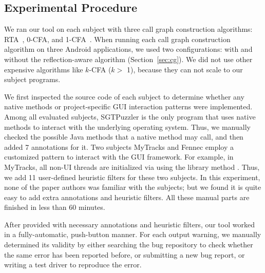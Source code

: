 \subsection{Experimental Procedure}
\label{sec:procedural}

We ran our tool on each subject with three call graph construction
algorithms: RTA~\cite{rta}, 0-CFA, and 1-CFA~\cite{kcfa}.  When running
each call graph construction algorithm on three Android applications, we
used two configurations: with and without the reflection-aware algorithm 
(Section~\ref{sec:cg}).  We did not use other expensive algorithms like $k$-CFA ($k >$ 1),
because they can not scale to our subject programs.

We first inspected the source code of each subject to determine whether any
native methods or project-specific GUI interaction patterns were implemented.
Among all evaluated subjects, SGTPuzzler is the only program that
uses native methods to interact with
the underlying operating system. Thus, we manually checked the possible
Java methods that a native method may call, and then added 7 
annotations for it. Two subjects MyTracks and Fennec employ a customized pattern
to interact with the GUI framework. For example, in MyTracks, all non-UI
threads are initialized via using the library method .
Thus, we add 11 user-defined heuristic filters for these two subjects.
In this experiment, none of the paper
authors was familiar with the subjects; but we found it is quite easy
to add extra annotations and heuristic filters. All these
manual parts are finished in less than 60 minutes.

After provided with necessary annotations and heuristic filters,
our tool worked in a fully-automatic, push-button manner. For each output
warning, we manually determined its validity by either searching the
bug repository to check whether the same error has been reported before,
or submitting a new bug report, or writing a test driver to reproduce
the error.



